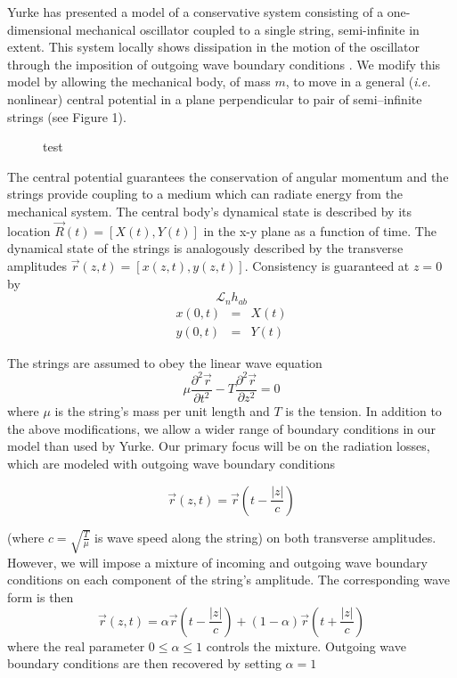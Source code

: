 Yurke has presented a model of a conservative system consisting 
of a one-dimensional mechanical oscillator coupled to a single string, 
semi-infinite in extent.
This system locally shows dissipation in the motion of the 
oscillator through the imposition of outgoing wave 
boundary conditions \cite{yurke84}.
We modify this model by allowing the mechanical body, of mass $m$, 
to move in a general (\emph{i.e.} nonlinear) central potential in 
a plane perpendicular to pair of semi--infinite strings (see 
Figure 1).  
\begin{figure}
\begin{center}
\end{center}
\caption{test}
\end{figure}
The central potential guarantees the conservation of angular 
momentum and the strings provide coupling to a medium which can 
radiate energy from the mechanical system.  
The central body's dynamical state is described by its location 
${\vec R}(t) = \left[ X(t), Y(t) \right]$ in the x-y plane as a 
function of time.  
The dynamical state of the strings is analogously described by 
the transverse amplitudes ${\vec r}(z,t) = \left[ x(z,t), y(z,t) 
\right]$.  
Consistency is guaranteed at $z = 0$ by
\[
  {\mathcal L}_{n} h_{ab}
\]
\begin{eqnarray}\label{eq:consist_cond}
	x(0,t) & = & X(t) \nonumber \\
   y(0,t) & = & Y(t)  
\end{eqnarray}

The strings are assumed to obey the linear wave equation
\begin{equation}\label{eq:wave_eq}
	\mu \frac{\partial ^2 {\vec r}}{\partial t^2} 
       - T  \frac{\partial ^2 {\vec r}}{\partial z^2} 
	= 0
\end{equation}
where $\mu$ is the string's mass per unit length and $T$ is the 
tension.  
In addition to the above modifications, we allow a wider range of 
boundary conditions in our model than used by Yurke.  
Our primary focus will be on the radiation losses, which are 
modeled with outgoing wave boundary conditions 

\[
	{\vec r}(z,t) = {\vec r} \left( t - \frac{|z|}{c} \right)
\]

(where $c = \sqrt{ \frac{T}{\mu}}$ is wave speed along the string) 
on both transverse amplitudes.
However, we will impose a mixture of incoming and outgoing 
wave boundary conditions on each component of the string's 
amplitude.  
The corresponding wave form is then
\begin{equation}\label{eq:mixed_bcs}
  {\vec r}(z,t) = \alpha {\vec r}\left( t - \frac{|z|}{c} \right) 
                + \left(1 - \alpha \right){\vec r} \left( t + \frac{|z|}{c} \right)
\end{equation}
where the real parameter $0 \le \alpha \le 1$ controls the 
mixture.  Outgoing wave boundary conditions are then recovered by 
setting $\alpha = 1$ 

